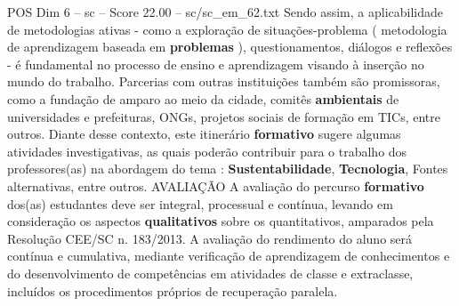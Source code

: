\begin{textsample}{POS Dim 6 – sc – Score 22.00 – sc/sc\_em\_62.txt}
Sendo assim, a aplicabilidade de metodologias ativas - como a exploração de situações-problema ( metodologia de aprendizagem baseada em \textbf{problemas} ), questionamentos, diálogos e reflexões - é fundamental no processo de ensino e aprendizagem visando à inserção no mundo do trabalho.
Parcerias com outras instituições também são promissoras, como a fundação de amparo ao meio da cidade, comitês \textbf{ambientais} de universidades e prefeituras, ONGs, projetos sociais de formação em TICs, entre outros.
Diante desse contexto, este itinerário \textbf{formativo} sugere algumas atividades investigativas, as quais poderão contribuir para o trabalho dos professores(as) na abordagem do tema : \textbf{Sustentabilidade}, \textbf{Tecnologia}, Fontes alternativas, entre outros.
AVALIAÇÃO A avaliação do percurso \textbf{formativo} dos(as) estudantes deve ser integral, processual e contínua, levando em consideração os aspectos \textbf{qualitativos} sobre os quantitativos, amparados pela Resolução CEE/SC n. 183/2013.
A avaliação do rendimento do aluno será contínua e cumulativa, mediante verificação de aprendizagem de conhecimentos e do desenvolvimento de competências em atividades de classe e extraclasse, incluídos os procedimentos próprios de recuperação paralela.

\end{textsample}
